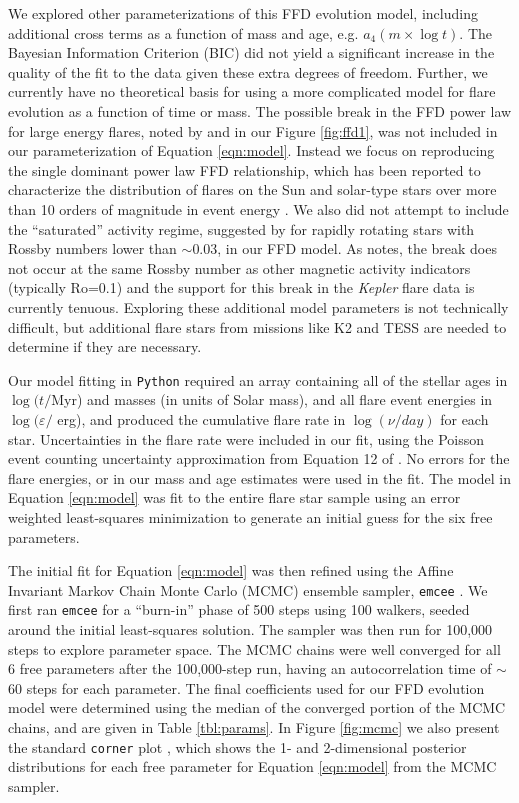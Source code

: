 \documentclass[preprint2]{aastex62}
\newcommand{\Kepler}{\textsl{Kepler}\xspace}
\begin{document}
We explored other parameterizations of this FFD evolution model, including additional cross terms as a function of mass and age, e.g. $a_4 (m \times \log t)$. The Bayesian Information Criterion (BIC) did not yield a significant increase in the quality of the fit to the data given these extra degrees of freedom. Further, we currently have no theoretical basis for using a more complicated model for flare evolution as a function of time or mass. The possible break in the FFD power law for large energy flares, noted by \citet{davenport2016} and in our Figure \ref{fig:ffd1}, was not included in our parameterization of Equation \ref{eqn:model}. Instead we focus on reproducing the single dominant power law FFD relationship, which has been reported to characterize the distribution of flares on the Sun and solar-type stars over more than 10 orders of magnitude in event energy \citep[e.g. Fig. 9 from][]{shibayama2013}. We also did not attempt to include the ``saturated'' activity regime, suggested by \citet{davenport2016} for rapidly rotating stars with Rossby numbers lower than $\sim$0.03, in our FFD model. As \citet{davenport2016} notes, the break does not occur at the same Rossby number as other magnetic activity indicators (typically Ro=0.1) and the support for this break in the \Kepler flare data is currently tenuous. Exploring these additional model parameters is not technically difficult, but additional flare stars from missions like K2 and TESS are needed to determine if they are necessary. 


Our model fitting in {\tt Python} required an array containing all of the stellar ages in $\log(t/$Myr) and masses (in units of Solar mass), and all flare event energies in $\log(\varepsilon/$ erg), and produced the cumulative flare rate in $\log (\nu/day)$ for each star. Uncertainties in the flare rate were included in our fit, using the Poisson event counting uncertainty approximation from Equation 12 of \citet{gehrels1986}. No errors for the flare energies, or in our mass and age estimates were used in the fit. The model in Equation \ref{eqn:model} was fit to the entire flare star sample using an error weighted least-squares minimization to generate an initial guess for the six free parameters.

The initial fit for Equation \ref{eqn:model} was then refined using the Affine Invariant Markov Chain Monte Carlo (MCMC) ensemble sampler, {\tt emcee} \citep{emcee}. We first ran {\tt emcee}  for a ``burn-in'' phase of 500 steps using 100 walkers, seeded around the initial least-squares solution. The sampler was then run for 100,000 steps to explore parameter space. The MCMC chains were well converged for all 6 free parameters after the 100,000-step run, having an autocorrelation time of $\sim$60 steps for each parameter.
The final coefficients used for our FFD evolution model were determined using the median of the converged portion of the MCMC chains, and are given in Table \ref{tbl:params}. In Figure \ref{fig:mcmc} we also present the standard {\tt corner} plot \citep{corner}, which shows the 1- and 2-dimensional posterior distributions for each free parameter for Equation \ref{eqn:model} from the MCMC sampler.
\end{document}
